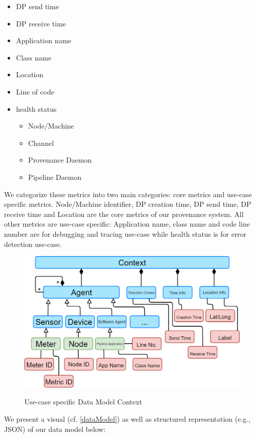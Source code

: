 \begin{itemize}
\begin{itemize}
			\item DP send time
			\item DP receive time
			\item Application name
			\item Class name
			\item Location
			\item Line of code 
			\item health status
				\begin{itemize}
					\item Node/Machine
					\item Channel
					\item Provenance Daemon
					\item Pipeline Daemon
				\end{itemize}		
		\end{itemize}
We categorize these metrics into two main categories: core metrics and use-case specific metrics. Node/Machine identifier, DP creation time, DP send time, DP receive time and Location are the core metrics of our provenance system. All other metrics are use-case specific: Application name, class name and code line number are for debugging and tracing use-case while health status is for error detection use-case.

\begin{figure}[h]
\centering
\includegraphics[width=\linewidth]{figures/contextIdp.png}\\
\caption{Use-case specific Data Model Context}
\label{idpDataModelContext}
\end{figure}
We present a visual (cf. \ref{dataModel}) as well as structured representation (e.g., JSON) of our data model below:


\end{itemize}
